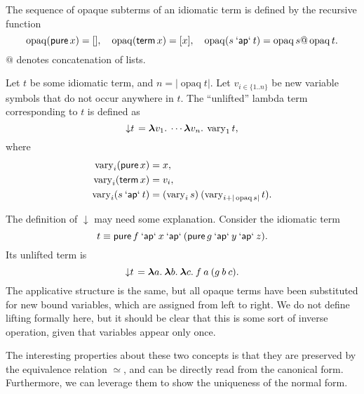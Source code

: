 \begin{definition}\label{def:opaque-seq}
The sequence of opaque subterms of an idiomatic term is defined by the
recursive function
\[
	\operatorname{opaq}(\operatorname{\mathsf{pure}} x) = [], \quad
	\operatorname{opaq}(\operatorname{\mathsf{term}} x) = [x], \quad
	\operatorname{opaq}(s \mathbin{\mathsf{`ap`}} t) = \operatorname{opaq} s @ \operatorname{opaq} t.
\]
$@$ denotes concatenation of lists.
\end{definition}

\begin{definition}[Unlifting]\label{def:unlifting}
Let $t$ be some idiomatic term, and $n = |\operatorname{opaq} t|$.
Let $v_{i \in \{1..n\}}$ be new variable symbols that do not occur anywhere in
$t$.
The ``unlifted'' lambda term corresponding to $t$ is defined as
\[ \left\downarrow t\right. = {\boldsymbol\lambda} v_1.\>\cdots {\boldsymbol\lambda} v_n.\>\operatorname{vary}_1 t, \]
where
\begin{align}
	\operatorname{vary}_i (\operatorname{\mathsf{pure}} x) &= x, \\
	\operatorname{vary}_i (\operatorname{\mathsf{term}} x) &= v_i, \\
	\operatorname{vary}_i (s \mathbin{\mathsf{`ap`}} t) &=
		(\operatorname{vary}_i s) \> (\operatorname{vary}_{i + |\operatorname{opaq} s|} t).
\end{align}
\end{definition}

\begin{example}\label{exmp:unlift}
The definition of $\downarrow$ may need some explanation.
Consider the idiomatic term
\[ t \equiv \operatorname{\mathsf{pure}}{f} \mathbin{\mathsf{`ap`}} x \mathbin{\mathsf{`ap`}} (\operatorname{\mathsf{pure}}{g} \mathbin{\mathsf{`ap`}} y \mathbin{\mathsf{`ap`}} z). \]
Its unlifted term is
\[ \left\downarrow t\right. = {\boldsymbol\lambda} a.\>{\boldsymbol\lambda} b.\>{\boldsymbol\lambda} c.\>f \> a \> (g \> b \> c). \]
The applicative structure is the same, but all opaque terms have been
substituted for new bound variables, which are assigned from left to right.
We do not define lifting formally here, but it should be clear that this is
some sort of inverse operation, given that variables appear only once.
\end{example}

The interesting properties about these two concepts is that they are preserved
by the equivalence relation $\simeq$, and can be directly read from the
canonical form.
Furthermore, we can leverage them to show the uniqueness of the normal form.

